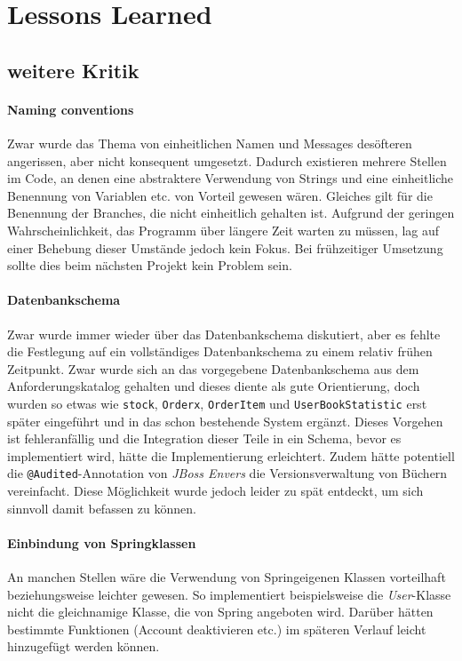\section{Lessons Learned}

	\subsection{weitere Kritik}	
		\paragraph{Naming conventions} Zwar wurde das Thema von einheitlichen Namen und Messages desöfteren angerissen, aber nicht konsequent umgesetzt. Dadurch existieren mehrere Stellen im Code, an denen eine abstraktere Verwendung von Strings und eine einheitliche Benennung von Variablen etc. von Vorteil gewesen wären. Gleiches gilt für die Benennung der Branches, die nicht einheitlich gehalten ist. Aufgrund der geringen Wahrscheinlichkeit, das Programm über längere Zeit warten zu müssen, lag auf einer Behebung dieser Umstände jedoch kein Fokus. Bei frühzeitiger Umsetzung sollte dies beim nächsten Projekt kein Problem sein.
		
		\paragraph{Datenbankschema} Zwar wurde immer wieder über das Datenbankschema diskutiert, aber es fehlte die Festlegung auf ein vollständiges Datenbankschema zu einem relativ frühen Zeitpunkt. Zwar wurde sich an das vorgegebene Datenbankschema aus dem Anforderungskatalog gehalten und dieses diente als gute Orientierung, doch wurden so etwas wie \texttt{stock}, \texttt{Orderx}, \texttt{OrderItem} und \texttt{UserBookStatistic} erst später eingeführt und in das schon bestehende System ergänzt. Dieses Vorgehen ist fehleranfällig und die Integration dieser Teile in ein Schema, bevor es implementiert wird, hätte die Implementierung erleichtert. Zudem hätte potentiell die \texttt{@Audited}-Annotation von \textit{JBoss Envers} die Versionsverwaltung von Büchern vereinfacht. Diese Möglichkeit wurde jedoch leider zu spät entdeckt, um sich sinnvoll damit befassen zu können.
		
		\paragraph{Einbindung von Springklassen} An manchen Stellen wäre die Verwendung von Springeigenen Klassen vorteilhaft beziehungsweise leichter gewesen. So implementiert beispielsweise die \textit{User}-Klasse nicht die gleichnamige Klasse, die von Spring angeboten wird. Darüber hätten bestimmte Funktionen (Account deaktivieren etc.) im späteren Verlauf leicht hinzugefügt werden können.
		
